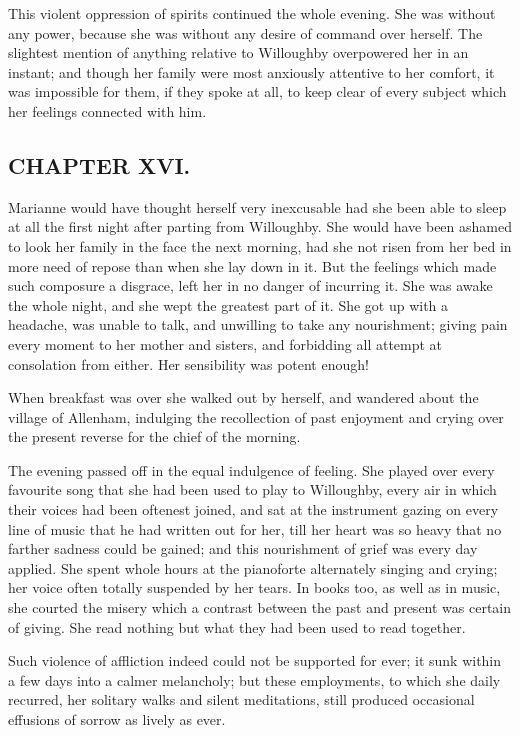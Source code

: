 This violent oppression of spirits continued the whole evening. She was without any power, because she was without any desire of command over herself. The slightest mention of anything relative to Willoughby overpowered her in an instant; and though her family were most anxiously attentive to her comfort, it was impossible for them, if they spoke at all, to keep clear of every subject which her feelings connected with him.

\subsection[chapter-xvi.]{\useURL[url16][][][]\from[url16]CHAPTER XVI.}

Marianne would have thought herself very inexcusable had she been able to sleep at all the first night after parting from Willoughby. She would have been ashamed to look her family in the face the next morning, had she not risen from her bed in more need of repose than when she lay down in it. But the feelings which made such composure a disgrace, left her in no danger of incurring it. She was awake the whole night, and she wept the greatest part of it. She got up with a headache, was unable to talk, and unwilling to take any nourishment; giving pain every moment to her mother and sisters, and forbidding all attempt at consolation from either. Her sensibility was potent enough!

When breakfast was over she walked out by herself, and wandered about the village of Allenham, indulging the recollection of past enjoyment and crying over the present reverse for the chief of the morning.

The evening passed off in the equal indulgence of feeling. She played over every favourite song that she had been used to play to Willoughby, every air in which their voices had been oftenest joined, and sat at the instrument gazing on every line of music that he had written out for her, till her heart was so heavy that no farther sadness could be gained; and this nourishment of grief was every day applied. She spent whole hours at the pianoforte alternately singing and crying; her voice often totally suspended by her tears. In books too, as well as in music, she courted the misery which a contrast between the past and present was certain of giving. She read nothing but what they had been used to read together.

Such violence of affliction indeed could not be supported for ever; it sunk within a few days into a calmer melancholy; but these employments, to which she daily recurred, her solitary walks and silent meditations, still produced occasional effusions of sorrow as lively as ever.

